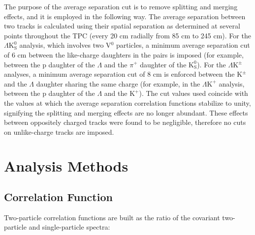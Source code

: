 \documentclass[ALICE,manyauthors]{cernphprep}
\newcommand{\Lam}{$\Lambda$\xspace}
\newcommand{\KchP}{$\mathrm{K^{+}}$\xspace}
\newcommand{\Kpm}{$\mathrm{K^{\pm}}$\xspace}
\newcommand{\Ks}{$\mathrm{K^{0}_{S}}$\xspace}
\newcommand{\LamKchP}{$\Lambda\mathrm{K^{+}}$\xspace}
\newcommand{\LamKpm}{$\Lambda\mathrm{K^{\pm}}$\xspace}
\newcommand{\LamKs}{$\Lambda\mathrm{K^{0}_{S}}$\xspace}
\newcommand{\Vz}{V$^{0}$\xspace}
\begin{document}
The purpose of the average separation cut is to remove splitting and merging effects, and it is employed in the following way.  
The average separation between two tracks is calculated using their spatial separation as determined at several points throughout the TPC (every 20 cm radially from 85 cm to 245 cm).
For the \LamKs analysis, which involves two \Vz particles, a minimum average separation cut of 6 cm between the like-charge daughters in the pairs is imposed (for example, between the p daughter of the \Lam and the $\pi^{+}$ daughter of the \Ks).
For the \LamKpm analyses, a minimum average separation cut of 8 cm is enforced between the \Kpm and the \Lam daughter sharing the same charge (for example, in the \LamKchP analysis, between the p daughter of the \Lam and the \KchP).
The cut values used coincide with the values at which the average separation correlation functions stabilize to unity, signifying the splitting and merging effects are no longer abundant.
These effects between oppositely charged tracks were found to be negligible, therefore no cuts on unlike-charge tracks are imposed.

\section{Analysis Methods}
\label{sec:AnalysisMethods}

\subsection{Correlation Function}
\label{sec:CorrelationFunction}
Two-particle correlation functions are built as the ratio of the covariant two-particle and single-particle spectra:
\end{document}

